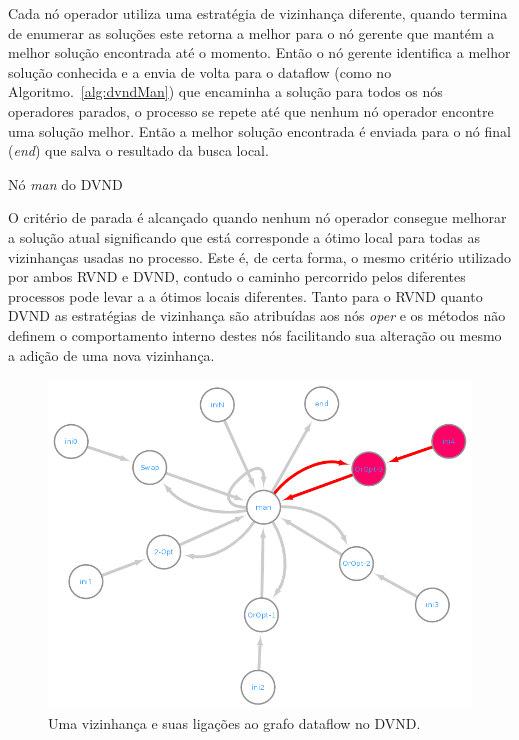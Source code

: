 Cada nó operador utiliza uma estratégia de vizinhança diferente, quando termina de enumerar as soluções este retorna a melhor para o nó gerente que mantém a melhor solução encontrada até o momento.
Então o nó gerente identifica a melhor solução conhecida e a envia de volta para o dataflow (como no Algoritmo.~\ref{alg:dvndMan}) que encaminha a solução para todos os nós operadores parados, o processo se repete até que nenhum nó operador encontre uma solução melhor.
Então a melhor solução encontrada é enviada para o nó final (\textit{end}) que salva o resultado da busca local.

\begin{algorithm}[htpb]
\caption{Nó \textit{man} do DVND}
\label{alg:dvndMan}
\begin{algorithmic}[1]
    \EndFunction
\end{algorithmic}
\end{algorithm}

O critério de parada é alcançado quando nenhum nó operador consegue melhorar a solução atual significando que está corresponde a ótimo local para todas as vizinhanças usadas no processo.
Este é, de certa forma, o mesmo critério utilizado por ambos RVND e DVND, contudo o caminho percorrido pelos diferentes processos pode levar a a ótimos locais diferentes. Tanto para o RVND quanto DVND as estratégias de vizinhança são atribuídas aos nós \textit{oper} e os métodos não definem o comportamento interno destes nós facilitando sua alteração ou mesmo a adição de uma nova vizinhança.

\begin{figure}[htbp]
    \centerline{\includegraphics[scale=0.6]{figuras/dvnd/DVND_dataflow_nomesDestacado.png}}
    \caption{Uma vizinhança e suas ligações ao grafo dataflow no DVND.}
    \label{fig:dvndGraphDestacado}
\end{figure}

